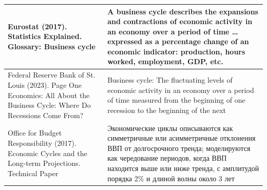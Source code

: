 \begin{longtable}{
    |>{\RaggedRight\arraybackslash}p{}
    |p{}|
    }
    Eurostat (2017). Statistics Explained. Glossary: \textquotedbl{}Business cycle\textquotedbl{}\cite{Eurostat-2017}
    &
    A business cycle describes the expansions and contractions of economic activity in an economy over a period of time … expressed as a percentage change of an economic indicator: production, hours worked, employment, GDP, etc. \\ \hline

    Federal Reserve Bank of St. Louis (2023). Page One Economics: All About the Business Cycle: Where Do Recessions Come From?\cite{FRED-2023}
    &
    Business cycle: The fluctuating levels of economic activity in an economy over a period of time measured from the beginning of one recession to the beginning of the next \\ \hline

    Office for Budget Responsibility (2017). Economic Cycles and the Long-term Projections. Technical Paper\cite{OBR-2017}
    &
    Экономические циклы описываются как симметричные или асимметричные отклонения ВВП от долгосрочного тренда; моделируются как чередование периодов, когда ВВП находится выше или ниже тренда, с амплитудой порядка 2\% и длиной волны около 3 лет \\ \hline
\end{longtable}